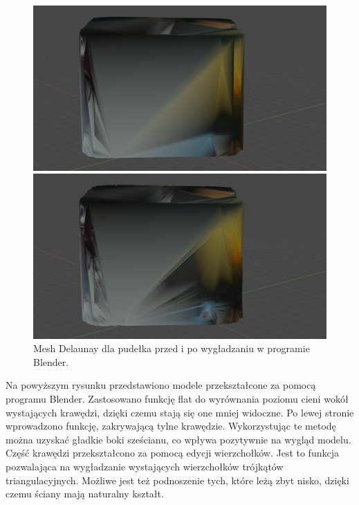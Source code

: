 \begin{figure}[H]
\centering
    \begin{minipage}[b]{0.45\linewidth}
        \includegraphics[scale=0.12]{delaBlendBoxgladkie.PNG}
    \end{minipage}
\quad
    \begin{minipage}[b]{0.45\linewidth}
        \includegraphics[scale=0.12]{delaBlendBoxNiegladkie.png}
    \end{minipage}
\caption{Mesh Delaunay dla pudełka przed i po wygładzaniu w programie Blender.}
\label{fig:blenderDela}
\end{figure}
Na powyższym rysunku przedstawiono modele przekształcone za pomocą programu Blender. Zastosowano funkcję flat do wyrównania poziomu cieni wokół wystających krawędzi, dzięki czemu stają się one mniej widoczne. Po lewej stronie wprowadzono funkcję, zakrywającą tylne krawędzie. Wykorzystując te metodę można uzyskać gładkie boki sześcianu, co wpływa pozytywnie na wygląd modelu. Część krawędzi przekształcono za pomocą edycji wierzchołków. Jest to funkcja pozwalająca na wygładzanie wystających wierzchołków trójkątów triangulacyjnych. Możliwe jest też podnoszenie tych, które leżą zbyt nisko, dzięki czemu ściany mają naturalny kształt. 
